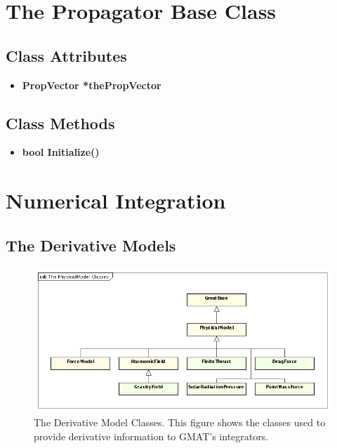 \section{The Propagator Base Class}

\subsection{Class Attributes}

\begin{itemize}
\item \textbf{PropVector *thePropVector}
\end{itemize}

\subsection{Class Methods}

\begin{itemize}
\item \textbf{bool Initialize()}
\end{itemize}

\section{Numerical Integration}


\subsection{\label{section:TheODEModel} The Derivative Models}

\begin{figure}[htb]
\begin{center}
\includegraphics[350,170]{Images/ThePhysicalModelClasses.png}
\caption[The Derivative Model Classes]{\label{figure:PhysicalModelClasses}The Derivative Model
Classes.  This figure shows the classes used to provide derivative information to GMAT's
integrators.}
\end{center}
\end{figure}

